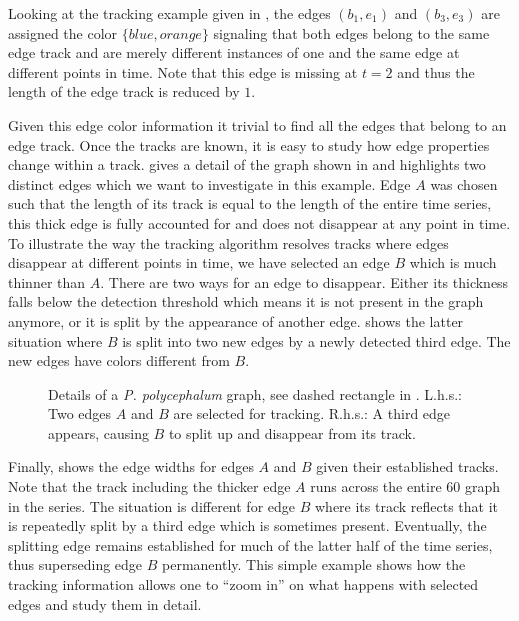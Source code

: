 	Looking at the tracking example given in , the edges $(b_1,e_1)$ and $(b_3,e_3)$ are assigned the color $\{blue, orange\}$ signaling that both edges belong to the same edge track and are merely different instances of one and the same edge at different points in time. Note that this edge is missing at $t=2$ and thus the length of the edge track is reduced by $1$.

	Given this edge color information it trivial to find all the edges that belong to an edge track. Once the tracks are known, it is easy to study how edge properties change within a track.  gives a detail of the graph shown in  and highlights two distinct edges which we want to investigate in this example. Edge $A$ was chosen such that the length of its track is equal to the length of the entire time series, \ie this thick edge is fully accounted for and does not disappear at any point in time. To illustrate the way the tracking algorithm resolves tracks where edges disappear at different points in time, we have selected an edge $B$ which is much thinner than $A$. There are two ways for an edge to disappear. Either its thickness falls below the detection threshold which means it is not present in the graph anymore, or it is split by the appearance of another edge.  shows the latter situation where $B$ is split into two new edges by a newly detected third edge. The new edges have colors different from $B$.

	\begin{figure}
		\centering
		\qquad
		\caption[Demo - Setup for tracking individual edges]{Details of a \emph{P. polycephalum} graph, see dashed rectangle in . L.h.s.: Two edges $A$ and $B$ are selected for tracking. R.h.s.: A third edge appears, causing $B$ to split up and disappear from its track.}
    \end{figure}

    Finally,  shows the edge widths for edges $A$ and $B$ given their established tracks. Note that the track including the thicker edge $A$ runs across the entire $60$ graph in the series. The situation is different for edge $B$ where its track reflects that it is repeatedly split by a third edge which is sometimes present. Eventually, the splitting edge remains established for much of the latter half of the time series, thus superseding edge $B$ permanently. This simple example shows how the tracking information allows one to ``zoom in'' on what happens with selected edges and study them in detail.

